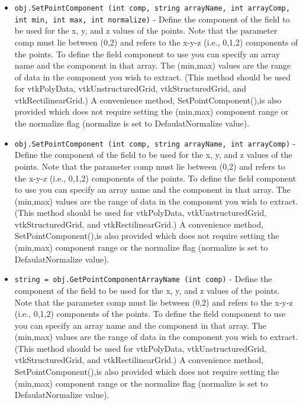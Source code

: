 \begin{itemize}
\item  \verb|obj.SetPointComponent (int comp, string arrayName, int arrayComp, int min, int max, int normalize)| -  Define the component of the field to be used for the x, y, and z values
 of the points. Note that the parameter comp must lie between (0,2) and
 refers to the x-y-z (i.e., 0,1,2) components of the points. To define
 the field component to use you can specify an array name and the
 component in that array. The (min,max) values are the range of data in
 the component you wish to extract. (This method should be used for
 vtkPolyData, vtkUnstructuredGrid, vtkStructuredGrid, and
 vtkRectilinearGrid.) A convenience method, SetPointComponent(),is also
 provided which does not require setting the (min,max) component range or
 the normalize flag (normalize is set to DefaulatNormalize value).

\item  \verb|obj.SetPointComponent (int comp, string arrayName, int arrayComp)| -  Define the component of the field to be used for the x, y, and z values
 of the points. Note that the parameter comp must lie between (0,2) and
 refers to the x-y-z (i.e., 0,1,2) components of the points. To define
 the field component to use you can specify an array name and the
 component in that array. The (min,max) values are the range of data in
 the component you wish to extract. (This method should be used for
 vtkPolyData, vtkUnstructuredGrid, vtkStructuredGrid, and
 vtkRectilinearGrid.) A convenience method, SetPointComponent(),is also
 provided which does not require setting the (min,max) component range or
 the normalize flag (normalize is set to DefaulatNormalize value).

\item  \verb|string = obj.GetPointComponentArrayName (int comp)| -  Define the component of the field to be used for the x, y, and z values
 of the points. Note that the parameter comp must lie between (0,2) and
 refers to the x-y-z (i.e., 0,1,2) components of the points. To define
 the field component to use you can specify an array name and the
 component in that array. The (min,max) values are the range of data in
 the component you wish to extract. (This method should be used for
 vtkPolyData, vtkUnstructuredGrid, vtkStructuredGrid, and
 vtkRectilinearGrid.) A convenience method, SetPointComponent(),is also
 provided which does not require setting the (min,max) component range or
 the normalize flag (normalize is set to DefaulatNormalize value).


\end{itemize}
